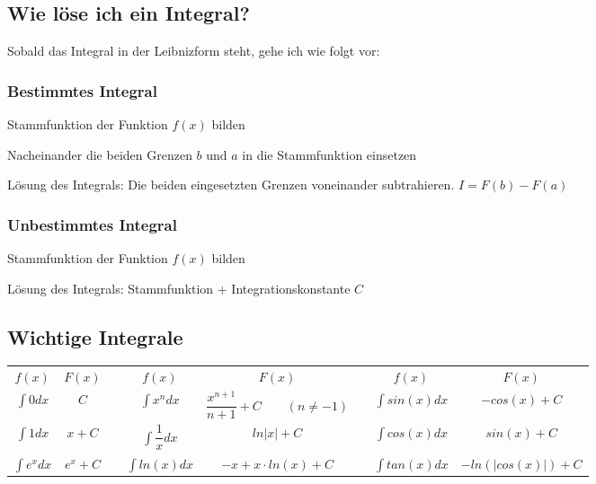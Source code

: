 \subsection{Wie löse ich ein Integral?}
Sobald das Integral in der Leibnizform steht, gehe ich wie folgt vor:
\subsubsection{Bestimmtes Integral}
\begin{compactenum}
	\item Stammfunktion der Funktion $f(x)$ bilden
	\item Nacheinander die beiden Grenzen $b$ und $a$ in die Stammfunktion einsetzen
	\item Lösung des Integrals: Die beiden eingesetzten Grenzen voneinander subtrahieren. $I=F(b)-F(a)$
\end{compactenum}
\subsubsection{Unbestimmtes Integral}
\begin{compactenum}
	\item Stammfunktion der Funktion $f(x)$ bilden
	\item Lösung des Integrals: Stammfunktion + Integrationskonstante $C$
\end{compactenum}

\subsection{Wichtige Integrale}
\renewcommand{\arraystretch}{2.0}
\begin{tabular}{|c|c|c|c|c|c|c|c|}
	\cline{1-2}\cline{4-5}\cline{7-8}
	\boldmath${f(x)}$ & \boldmath${F(x)}$ &\qquad\qquad\qquad& \boldmath${f(x)}$ & \boldmath${F(x)}$ &\qquad\qquad\qquad& \boldmath${f(x)}$ & \boldmath${F(x)}$\\
	\cline{1-2}\cline{4-5}\cline{7-8}
	$\displaystyle \int{0}dx$ & $C$ && $\displaystyle \int{x^n}d{x}$ & $\dfrac{x^{n+1}}{n+1}+C \qquad (n\ne-1)$ && $\displaystyle \int{sin(x)}dx$ & $-cos(x)+C$\\
	\cline{1-2}\cline{4-5}\cline{7-8}
	$\displaystyle \int{1}dx$ & $x+C$ && $\displaystyle \int{\dfrac{1}{x}}dx$ & $ln|x|+C$ && $\displaystyle \int{cos(x)}dx$ & $sin(x)+C$\\
	\cline{1-2}\cline{4-5}\cline{7-8}
	$\displaystyle \int{e^x}dx$ & $e^x+C$ && $\displaystyle \int{ln(x)}dx$ & $-x+x\cdot ln(x)+C$ && $\displaystyle \int{tan(x)}dx$ & $-ln(|cos(x)|)+C$\\
	\cline{1-2}\cline{4-5}\cline{7-8}
\end{tabular}
\renewcommand{\arraystretch}{1.0}


